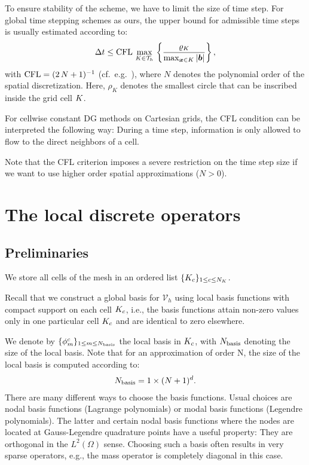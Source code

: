\documentclass{scrreprt}
\begin{document}
To ensure stability of the scheme, we have to limit the size of time step. 
For global time stepping schemes as ours, the upper bound for admissible time
steps is usually estimated according to:
\begin{align}
\label{eq:cfl_time_step}
\Delta
t \leq
\textup{CFL}\,\max_{K\in\mathcal{T}_h}\,\left\{
\frac{\varrho_K}{\max_{{\boldsymbol x}\in K}|{\boldsymbol b}|}
\right\},
\end{align}
with $\textup{CFL}=(2\,N+1)^{-1}$ (cf.~e.g.~\cite{cockburn_book}), where $N$
denotes the polynomial order of the spatial discretization.
Here, $\rho_K$ denotes the smallest circle that can be inscribed inside 
the grid cell $K$.
\begin{remark}
{\rm 
For cellwise constant DG methods on Cartesian grids, the CFL condition can be 
interpreted the following way:
}
During a time step,
information is only allowed to flow to the direct neighbors of
a cell.
\end{remark}
\begin{remark}
{\rm
Note that the CFL criterion imposes a severe restriction on the
time step size if we want to use higher order spatial approximations
($N>0$).} 
\end{remark}
\section{The local discrete operators}
\subsection{Preliminaries}
We store all cells of the mesh in an ordered list $\{
K_c \}_{1 \leq c \leq {N_{K}}}$.

Recall that we construct a global basis
for $\mathcal{V}_h$ using local basis
functions with compact support on each cell $K_c$, i.e., the basis functions
attain non-zero values only in one particular cell $K_c$ and are identical
to zero elsewhere.

We denote by $\{ \phi^{c}_{m} \}_{1 \leq m \leq
N_\textup{basis}}$ the local basis in $K_c$,
with $N_\textup{basis}$ denoting the size of the local basis. 
Note that for an approximation of order N, the size of the local basis is 
computed according to:
\begin{align}
N_\textup{basis} = 1\times(N+1)^d.
\end{align}
There are many different ways to choose the basis functions.
Usual choices are nodal basis functions (Lagrange polynomials) or
modal basis functions (Legendre polynomials).
The latter and certain nodal basis functions where the nodes are located at
Gauss-Legendre quadrature points have a useful property:
They are orthogonal in the $L^2(\Omega)$ sense.
Choosing such a basis often results in very sparse operators, e.g.,
the mass operator is completely diagonal in this case.
\end{document}
